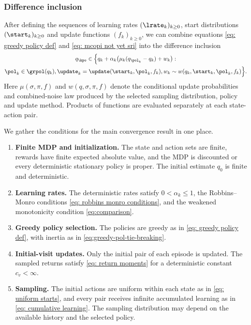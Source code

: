 \subsubsection{Difference inclusion}

After defining the sequences of learning rates $(\lrate_k)_{k \ge 0}$, start distributions $(\start_k)_{k \ge 0}$ and update functions $(f_k)_{k \ge 0}$,
we can combine equations \eqref{eq: greedy policy def} and \eqref{eq: mcopi not yet sri} into the difference inclusion
\begin{multline}
\label{eq: mcopi sa}
    q_\kpo
    \in
    \Big\{ q_k + \alpha_k \big( \mu_k(q_{\pol_k} - q_k) + w_k \big)
    :
    \\
    \pol_k \in \grpol(q_k),
    \update_k = \update(\start_k, \pol_k, f_k),
    w_k \sim w(q_k, \start_k, \pol_k, f_k)
    \Big\} .
\end{multline}
Here $\mu(\sigma,\pi,f)$ and $w(q,\sigma,\pi,f)$ denote the conditional update probabilities and combined-noise law produced by the selected sampling distribution, policy and update method. Products of functions are evaluated separately at each state-action pair.

We gather the conditions for the main convergence result in one place.

\begin{assumption}
\label{asp: standing}
\phantom{Assume}
\begin{enumerate}[label=(\arabic*)]
\item \textbf{Finite MDP and initialization.} The state and action sets are finite, rewards have finite expected absolute value, and the MDP is discounted or every deterministic stationary policy is proper. The initial estimate $q_0$ is finite and deterministic.
\item \textbf{Learning rates.} The deterministic rates satisfy $0<\alpha_k\le1$, the Robbins--Monro conditions \eqref{eq: robbins monro conditions}, and the weakened monotonicity condition \eqref{eq:comparison}.
\item \textbf{Greedy policy selection.} The policies are greedy as in \eqref{eq: greedy policy def}, with inertia as in \eqref{eq:greedy-pol-tie-breaking}.
\item \textbf{Initial-visit updates.} Only the initial pair of each episode is updated. The sampled returns satisfy \eqref{eq: return moments} for a deterministic constant $c_v<\infty$.
\item \textbf{Sampling.} The initial actions are uniform within each state as in \eqref{eq: uniform starts}, and every pair receives infinite accumulated learning as in \eqref{eq: cumulative learning}. The sampling distribution may depend on the available history and the selected policy.
\end{enumerate}
\end{assumption}

